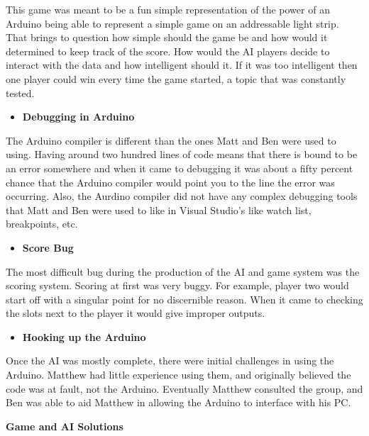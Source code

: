 \documentclass[twoside]{article}
\begin{document}
\text This game was meant to be a fun simple representation of the power 
of an Arduino being able to represent a simple game on an addressable light 
strip. That brings to question how simple should the game be and how would it determined 
to keep track of the score. How would the AI players decide to interact with the 
data and how intelligent should it. If it was too intelligent then one player could 
win every time the game started, a topic that was constantly tested.
\begin{itemize}
    \item\textbf{Debugging in Arduino} 
\end{itemize}
\text The Arduino compiler is different than the ones Matt and Ben were used to using. Having around two hundred lines of code means that there is bound to be an error somewhere and when  it came to debugging it was about a fifty percent chance that the Arduino compiler would point you to the line the error was occurring. Also, the Aurdino compiler did not have any complex debugging tools that Matt and Ben were used to like in Visual Studio's like watch list, breakpoints, etc.
\begin{itemize}
     \item\textbf{Score Bug} 
\end{itemize}
\text The most difficult bug during the production of the AI and game system was the scoring system. Scoring at first was very buggy. For example, player two would start off with a singular point for no discernible reason. When it came to checking the slots next to the player it would give improper outputs. 
\begin{itemize}
    \item\textbf{Hooking up the Arduino}
\end{itemize}
\text Once the AI was mostly complete, there were initial challenges in using the Arduino. Matthew had little experience using them, and originally believed the code was at fault, not the Arduino. Eventually Matthew consulted the group, and Ben was able to aid Matthew in allowing the Arduino to interface with his PC.

\hfill \break
\noindent\textbf{\Large Game and AI Solutions}
\end{document}
